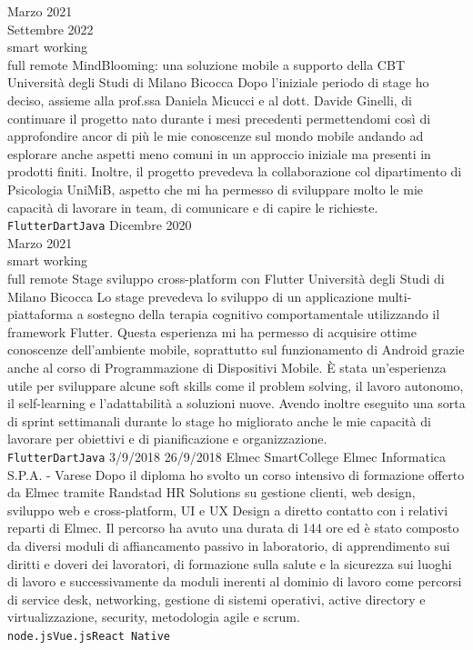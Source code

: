 \documentclass[9pt]{developercv} %
\begin{document}
\begin{entrylist}
	
	\entry
		{Marzo 2021 \\ Settembre 2022 \\\footnotesize{smart working}\\\footnotesize{full remote}}
		{MindBlooming: una soluzione mobile a supporto della CBT}
		{Università degli Studi di Milano Bicocca}
		{Dopo l'iniziale periodo di stage ho deciso, assieme alla prof.ssa Daniela Micucci e al dott. Davide Ginelli, di continuare il progetto nato durante i mesi precedenti permettendomi così di approfondire ancor di più le mie conoscenze sul mondo mobile andando ad esplorare anche aspetti meno comuni in un approccio iniziale ma presenti in prodotti finiti. Inoltre, il progetto prevedeva la collaborazione col dipartimento di Psicologia UniMiB, aspetto che mi ha permesso di sviluppare molto le mie capacità di lavorare in team, di comunicare e di capire le richieste. \\ \texttt{Flutter}\slashsep\texttt{Dart}\slashsep\texttt{Java}}
	\entry
		{Dicembre 2020 \\ Marzo 2021\\\footnotesize{smart working}\\\footnotesize{full remote}}
		{Stage sviluppo cross-platform con Flutter}
		{Università degli Studi di Milano Bicocca}
		{Lo stage prevedeva lo sviluppo di un applicazione multi-piattaforma a sostegno della terapia cognitivo comportamentale utilizzando il framework Flutter. Questa esperienza mi ha permesso di acquisire ottime conoscenze dell'ambiente mobile, soprattutto sul funzionamento di Android grazie anche al corso di Programmazione di Dispositivi Mobile. È stata un'esperienza utile per sviluppare alcune soft skills come il problem solving, il lavoro autonomo, il self-learning e l'adattabilità a soluzioni nuove. Avendo inoltre eseguito una sorta di sprint settimanali durante lo stage ho migliorato anche le mie capacità di lavorare per obiettivi e di pianificazione e organizzazione.  \\ \texttt{Flutter}\slashsep\texttt{Dart}\slashsep\texttt{Java}}
	\entry
		{3/9/2018  26/9/2018}
		{Elmec SmartCollege}
		{Elmec Informatica S.P.A. - Varese}
		{Dopo il diploma ho svolto un corso intensivo di formazione offerto da Elmec tramite Randstad HR Solutions su gestione clienti, web design, sviluppo web e cross-platform, UI e UX Design a diretto contatto con i relativi reparti di Elmec. Il percorso ha avuto una durata di 144 ore ed è stato composto da diversi moduli di affiancamento passivo in laboratorio, di apprendimento sui diritti e doveri dei lavoratori, di formazione sulla salute e la sicurezza sui luoghi di lavoro e successivamente da moduli inerenti al dominio di lavoro come percorsi di service desk, networking, gestione di sistemi operativi, active directory e virtualizzazione, security, metodologia agile e scrum.\\ \texttt{node.js}\slashsep\texttt{Vue.js}\slashsep\texttt{React Native}}

\end{entrylist}
\end{document}
